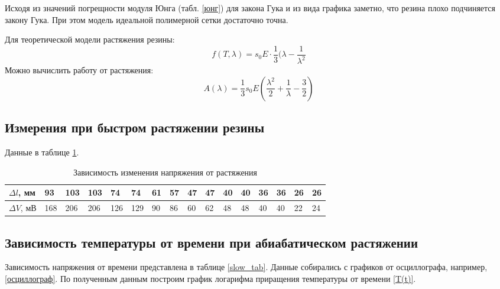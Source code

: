 \documentclass[a4paper,12pt]{article} %
\begin{document}
Исходя из значений погрещности модуля Юнга (табл. \ref{юнг}) для закона Гука и из вида графика заметно, что резина плохо подчиняется закону Гука. При этом модель идеальной полимерной сетки достаточно точна.

Для теоретической модели растяжения резины:
\begin{equation}
f(T, \lambda) = s_0E\cdot \frac{1}{3}(\lambda-\frac{1}{\lambda^2}
\end{equation}
Можно вычислить работу от растяжения:
\begin{equation}
\label{A}
A(\lambda) = \frac{1}{3}s_0E(\frac{\lambda^2}{2}+\frac{1}{\lambda}-\frac{3}{2})
\end{equation}



\subsection*{Измерения при быстром растяжении резины}
Данные в таблице \ref{fast_tab}. 
\begin{table}[h!]
\caption{Зависимость изменения напряжения от растяжения}
\label{fast_tab}
\begin{tabular}{|l|l|l|l|l|l|l|l|l|l|l|l|l|l|l|l|}
\hline
$\Delta l$, мм & 93  & 103 & 103 & 74  & 74  & 61 & 57 & 47 & 47 & 40 & 40 & 36 & 36 & 26 & 26 \\ \hline
$\Delta V$, мВ & 168 & 206 & 206 & 126 & 129 & 90 & 86 & 60 & 62 & 48 & 48 & 40 & 40 & 22 & 24 \\ \hline
\end{tabular}
\end{table}


\subsection*{Зависимость температуры от времени при абиабатическом растяжении}
Зависимость напряжения от времени представлена в таблице \ref{slow_tab}. Данные собирались с графиков от осциллографа, например, \ref{осциллограф}. По полученным данным построим график логарифма приращения температуры от времени \ref{T(t)}.
\end{document}

